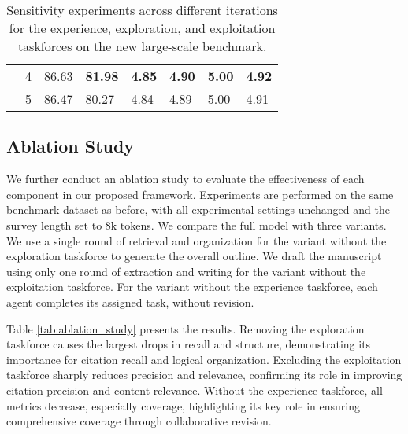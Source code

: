 \documentclass[manuscript,review,anonymous]{acmart}
\begin{document}
\begin{table}[h]
\begin{tabular}{clllllll}
            & \cellcolor{gray!15}4 & \cellcolor{gray!15}86.63 & \cellcolor{gray!15}\textbf{81.98} & \cellcolor{gray!15}\textbf{4.85} & \cellcolor{gray!15}\textbf{4.90} & \cellcolor{gray!15}\textbf{5.00} & \cellcolor{gray!15}\textbf{4.92} \\
            & 5 & 86.47 & 80.27 & 4.84 & 4.89 & 5.00 & 4.91 \\
            \bottomrule
        \end{tabular}
    \caption{Sensitivity experiments across different iterations for the experience, exploration, and exploitation taskforces on the new large-scale benchmark.}
    \label{tab:iteration_comparison}
\end{table}


\subsection{Ablation Study}
\label{sec:ablation_study}

We further conduct an ablation study to evaluate the effectiveness of each component in our proposed framework. Experiments are performed on the same benchmark dataset as before, with all experimental settings unchanged and the survey length set to 8k tokens. We compare the full model with three variants. We use a single round of retrieval and organization for the variant without the exploration taskforce to generate the overall outline. We draft the manuscript using only one round of extraction and writing for the variant without the exploitation taskforce. For the variant without the experience taskforce, each agent completes its assigned task, without revision.

Table \ref{tab:ablation_study} presents the results. Removing the exploration taskforce causes the largest drops in recall and structure, demonstrating its importance for citation recall and logical organization. Excluding the exploitation taskforce sharply reduces precision and relevance, confirming its role in improving citation precision and content relevance. Without the experience taskforce, all metrics decrease, especially coverage, highlighting its key role in ensuring comprehensive coverage through collaborative revision.
\end{document}

